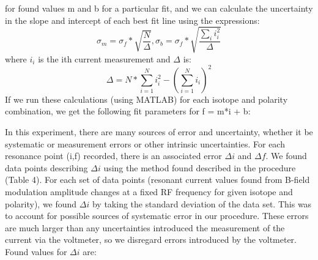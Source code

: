 \documentclass{article}
\begin{document}
    for found values m and b for a particular fit, and we can calculate the uncertainty in the slope and intercept of each best fit line using the expressions:
    \begin{equation}
        \sigma_m = \sigma_f*\sqrt{\frac{N}{\Delta}},
        \sigma_b = \sigma_f*\sqrt{\frac{\sum_{i} i_i^2}{\Delta}}
    \end{equation}
    where $i_i$ is the ith current measurement and $\Delta$ is:
    \begin{equation}
        \Delta = N*\sum_{i=1}^N i_i^2 - (\sum_{i=1}^N i_i)^2
    \end{equation}
    If we run these calculations (using MATLAB) for each isotope and polarity combination, we get the following fit parameters for f = m*i + b:
\begin{table}[H]
  \centering
  \caption{Slope and Intercept of Best Fit Lines for f(i)}
  \label{tab:addlabel}%
\end{table}%
In this experiment, there are many sources of error and uncertainty, whether it be systematic or measurement errors or other intrinsic uncertainties. For each resonance point (i,f) recorded, there is an associated error $\Delta i$ and $\Delta f$. We found data points describing $\Delta i$ using the method found described in the procedure (Table 4). For each set of data points (resonant current values found from B-field modulation amplitude changes at a fixed RF frequency for given isotope and polarity), we found $\Delta i$ by taking the standard deviation of the data set. This was to account for possible sources of systematic error in our procedure. These errors are much larger than any uncertainties introduced the measurement of the current via the voltmeter, so we disregard errors introduced by the voltmeter. Found values for $\Delta i$ are: \\
\end{document}
